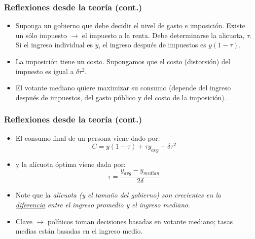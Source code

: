 \documentclass[14pt,aspectratio=169]{beamer}
\begin{document}
\begin{frame}\frametitle{Reflexiones desde la teoría (cont.)}
\begin{itemize}
\item Suponga un gobierno que debe decidir el nivel de gasto e
  imposición. Existe un sólo impuesto $\longrightarrow$ el impuesto a
  la renta. Debe determinarse la alicuota, $\tau$. Si el ingreso
  individual es $y$, el ingreso después de impuestos es $y(1-\tau)$.
\item La imposición tiene un costo. Supongamos que el costo
  (distorsión) del impuesto es igual a $\delta \tau^2$. 
\item El votante mediano quiere maximizar su consumo (depende del
  ingreso después de impuestos, del gasto público y del costo de la
  imposición).
\end{itemize}
\end{frame}
     


     \begin{frame}\frametitle{Reflexiones desde la teoría (cont.)}
\begin{itemize}\itemsep 15pt
\item El consumo final de un persona viene dado por:
\begin{equation}
C=y(1-\tau)+\tau y_{avg}-\delta \tau^2
\end{equation}
\item y la alícuota óptima viene dada por:
\begin{equation}
\tau=\frac{y_{avg}-y_{median}}{2\delta}
\end{equation}
\item Note que la \textit{alícuota (y el tamaño del gobierno) son crecientes
  en la \underline{diferencia} entre el ingreso promedio y el ingreso mediano}. 
\item Clave $\longrightarrow$ políticos toman decisiones
  basadas en votante mediano; tasas
  medias están basadas en el ingreso medio. 
\end{itemize}
\end{frame}
\end{document}
